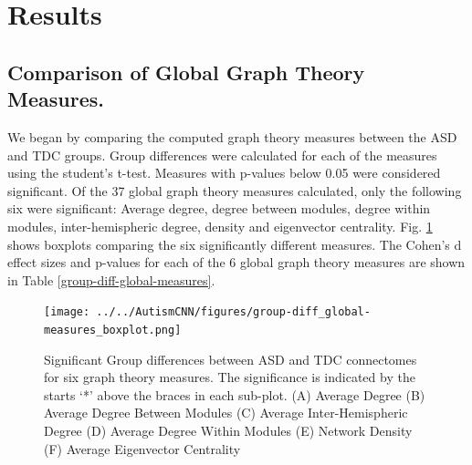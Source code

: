 \documentclass[10pt,conference]{IEEEtran}
\begin{document}

\section{Results}

    \subsection{Comparison of Global Graph Theory Measures.} 
    We began by comparing the computed graph theory measures between the ASD and TDC 
    groups. Group differences were calculated for each of the measures using the student's 
    t-test. Measures with p-values below 0.05 were considered significant. Of the 37 
    global graph theory measures calculated, only the following six were significant: 
    Average degree, degree between modules, degree within modules, inter-hemispheric 
    degree, density and eigenvector centrality. Fig. \ref{group-diff-boxplot-global-measures} 
    shows boxplots comparing the six significantly different measures. The Cohen's d 
    effect sizes and p-values for each of the 6 global graph theory measures are shown in 
    Table \ref{group-diff-global-measures}.

    \begin{figure}[ht]
        \vskip 0.2in
        \begin{center}
            \centerline{\texttt{[image: ../../AutismCNN/figures/group-diff\_global-measures\_boxplot.png]}}
            \caption{
                Significant Group differences between ASD and TDC connectomes for six graph
                theory measures. The significance is indicated by the starts `*' above the
                braces in each sub-plot. (A) Average Degree (B) Average Degree Between Modules
                (C) Average Inter-Hemispheric Degree (D) Average Degree Within Modules
                (E) Network Density (F) Average Eigenvector Centrality
            }
            \label{group-diff-boxplot-global-measures}
        \end{center}
        \vskip -0.2in
    \end{figure}
\end{document}
